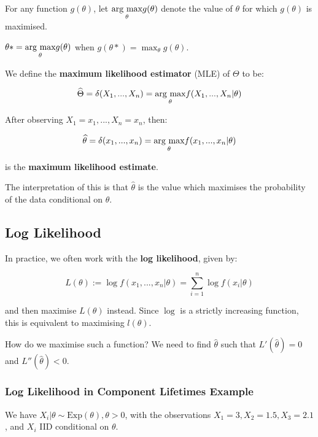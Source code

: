 \documentclass[a4paper]{article}
\begin{document}
        \begin{definition}
            For any function $g(\theta)$, let $\underset{{\theta}}{\text{arg max}} g(\theta)$ denote
            the value of $\theta$ for which $g(\theta)$ is maximised.

            $\theta* = \underset{{\theta}}{\text{arg max}} g(\theta)$ when $g(\theta*) = \max_\theta
            g(\theta)$.

            We define the \textbf{maximum likelihood estimator} (MLE) of
            $\Theta$ to be:

            \[
                \widehat \Theta = \delta(X_1, ..., X_n) = \underset{{\theta}}{\text{arg max}} f(X_1,
                ..., X_n | \theta)
            \]

            After observing $X_1 = x_1, ..., X_n = x_n$, then:

            \[
                \widehat \theta = \delta(x_1, ..., x_n) = \underset{{\theta}}{\text{arg max}} f(x_1,
                ..., x_n | \theta)
            \]

            is the \textbf{maximum likelihood estimate}.
        \end{definition}

        The interpretation of this is that $\widehat \theta$ is the value which
        maximises the probability of the data conditional on $\theta$.

        \subsection{Log Likelihood}
            In practice, we often work with the \textbf{log likelihood}, given
            by:

            \[
                L(\theta) := \log f(x_1, ..., x_n | \theta) = \sum_{i = 1}^n
                \log f(x_i | \theta)
            \]

            and then maximise $L(\theta)$ instead. Since $\log$ is a strictly
            increasing function, this is equivalent to maximising $l(\theta)$.

            How do we maximise such a function? We need to find $\widehat
            \theta$ such that $L'(\widehat \theta) = 0$ and $L''(\widehat
            \theta) < 0$.

            \subsubsection{Log Likelihood in Component Lifetimes Example}
                We have $X_i | \theta \sim \text{Exp}(\theta), \theta > 0$, with
                the observations $X_1 = 3, X_2 = 1.5, X_3 = 2.1$, and $X_i$ IID
                conditional on $\theta$.
\end{document}
